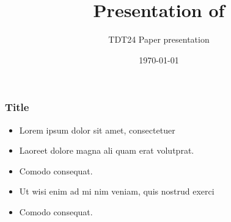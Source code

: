 \documentclass[screen]{beamer}
\title[Compiler Offloading]%
{Presentation of }
\subtitle{TDT24 Paper presentation}
\institute[IDI - NTNU]{Institutt for Datateknikk og Informasjonsvitenskap}
\date[November 2014]{\today} %
\begin{document}
\ntnutitlepage

\begin{frame}
  \frametitle{Title}
  \begin{itemize}
  \item Lorem ipsum dolor sit amet, consectetuer
  \item Laoreet dolore magna ali quam erat volutprat.
  \item Comodo consequat.
  \item Ut wisi enim ad mi nim veniam, quis nostrud exerci
  \item Comodo consequat.
  \end{itemize}
\end{frame}
\end{document}
